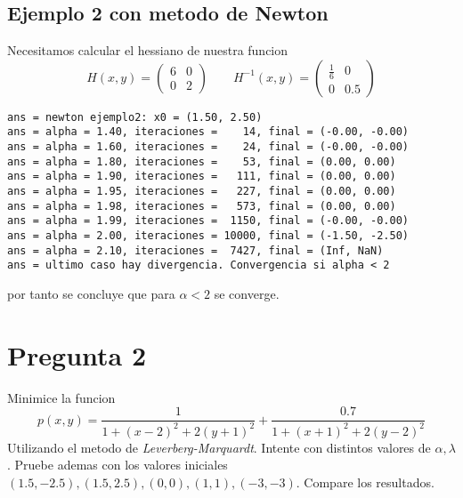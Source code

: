\documentclass[letterpaper]{article}
\begin{document}
\subsection*{Ejemplo 2 con metodo de Newton}
\noindent Necesitamos calcular el hessiano de nuestra funcion
\[ H(x,y) =
  \begin{pmatrix}
    6 & 0 \\
    0 & 2
  \end{pmatrix}
  \qquad
  H^{-1}(x,y) =
  \begin{pmatrix}
    \frac{1}{6} & 0 \\
    0 & 0.5
  \end{pmatrix}
\]
\begin{verbatim}
ans = newton ejemplo2: x0 = (1.50, 2.50)
ans = alpha = 1.40, iteraciones =    14, final = (-0.00, -0.00)
ans = alpha = 1.60, iteraciones =    24, final = (-0.00, -0.00)
ans = alpha = 1.80, iteraciones =    53, final = (0.00, 0.00)
ans = alpha = 1.90, iteraciones =   111, final = (0.00, 0.00)
ans = alpha = 1.95, iteraciones =   227, final = (0.00, 0.00)
ans = alpha = 1.98, iteraciones =   573, final = (0.00, 0.00)
ans = alpha = 1.99, iteraciones =  1150, final = (-0.00, -0.00)
ans = alpha = 2.00, iteraciones = 10000, final = (-1.50, -2.50)
ans = alpha = 2.10, iteraciones =  7427, final = (Inf, NaN)
ans = ultimo caso hay divergencia. Convergencia si alpha < 2
\end{verbatim}
por tanto se concluye que para \(\alpha < 2\) se converge.

\section*{Pregunta 2}
\noindent Minimice la funcion
\[ p(x,y) = \frac{1}{1 + (x-2)^2 + 2 (y+1)^2} + \frac{0.7}{1 + (x+1)^2 +
    2 (y - 2)^2 } \]
Utilizando el metodo de \emph{Leverberg-Marquardt}. Intente con distintos
valores de \(\alpha, \lambda\). Pruebe ademas con los valores iniciales
\((1.5, -2.5), (1.5, 2.5), (0,0), (1,1), (-3,-3)\). Compare los resultados.
\newline
\end{document}
